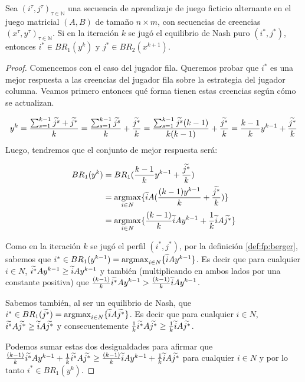 \begin{lemma}
    Sea $(i^\tau, j^\tau)_{\tau \in \mathbb{N}}$ una secuencia de aprendizaje de juego ficticio alternante en el juego matricial $(A, B)$ de tamaño $n \times m$, con secuencias de creencias $(x^\tau, y^\tau)_{\tau \in \mathbb{N}}$. Si en la iteración $k$ se jugó el equilibrio de Nash puro $(i^*, j^*)$, entonces $i^* \in BR_1(y^{k})$ y $j^* \in BR_2(x^{k+1})$.
\end{lemma}
\begin{proof}
    Comencemos con el caso del jugador fila. Queremos probar que $i^*$ es una mejor respuesta a las creencias del jugador fila sobre la estrategia del jugador columna. Veamos primero entonces qué forma tienen estas creencias según cómo se actualizan.
    
    \[
        y^k = \frac{\sum_{s=1}^{k-1}{\widetilde{j^s}} + \widetilde{j^*}}{k}
            = \frac{\sum_{s=1}^{k-1}{\widetilde{j^s}}}{k} + \frac{\widetilde{j^*}}{k}
            = \frac{\sum_{s=1}^{k-1}{\widetilde{j^s}}(k-1)}{k(k-1)} + \frac{\widetilde{j^*}}{k}
            = \frac{k - 1}{k} y^{k-1} + \frac{\widetilde{j^*}}{k}
    \]
    Luego, tendremos que el conjunto de mejor respuesta será:
    
    \begin{align*}
        BR_1(y^k) &= BR_1(\frac{k - 1}{k} y^{k-1} + \frac{ \widetilde{j^*}}{k}) \\
        &= \operatorname*{argmax}_{i \in N} \{\widetilde{i} A(\frac{(k - 1)y^{k-1}}{k} + \frac{ \widetilde{j^*}}{k})\}\\
        &= \operatorname*{argmax}_{i \in N} \{\frac{(k - 1)}{k}\widetilde{i} Ay^{k-1} + \frac{1}{k}\widetilde{i} A \widetilde{j^*}\}
    \end{align*}

    Como en la iteración $k$ se jugó el perfil $(i^*, j^*)$, por la definición \ref{def:fp:berger}, sabemos que $i^* \in BR_1(y^{k-1}) = \operatorname*{argmax}_{i \in N}\{\widetilde{i}Ay^{k-1}\}$. Es decir que para cualquier $i \in N$, $\widetilde{i^*}Ay^{k-1} \geq \widetilde{i}Ay^{k-1}$ y también (multiplicando en ambos lados por una constante positiva) que $\frac{(k - 1)}{k}\widetilde{i^*}Ay^{k-1} > \frac{(k - 1)}{k}\widetilde{i}Ay^{k-1}$.

    Sabemos también, al ser un equilibrio de Nash, que $i^* \in BR_1(\widetilde{j^*}) = \operatorname*{argmax}_{i \in N}\{\widetilde{i} A \widetilde{j^*}\}$. Es decir que para cualquier $i \in N$, $\widetilde{i^*}A \widetilde{j^*} \geq \widetilde{i}A \widetilde{j^*}$ y consecuentemente $\frac{1}{k}\widetilde{i^*}A \widetilde{j^*} \geq \frac{1}{k}\widetilde{i}A \widetilde{j^*}$.

    Podemos sumar estas dos desigualdades para afirmar que $\frac{(k - 1)}{k}\widetilde{i^*}Ay^{k-1} + \frac{1}{k}\widetilde{i^*}A \widetilde{j^*} \geq \frac{(k - 1)}{k}\widetilde{i}Ay^{k-1} + \frac{1}{k}\widetilde{i} A \widetilde{j^*}$ para cualquier $i \in N$ y por lo tanto $i^* \in BR_1(y^{k})$.


\end{proof}
